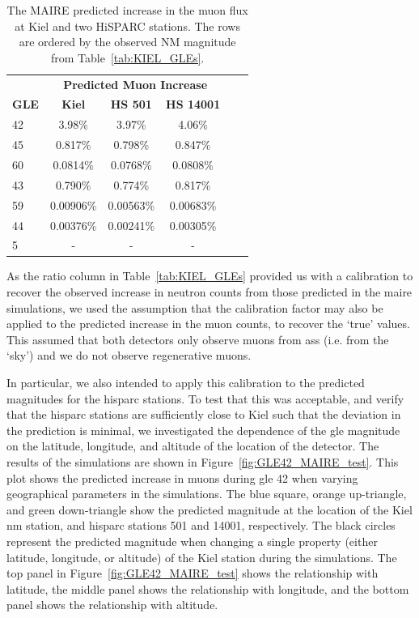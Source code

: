 \begin{table}[ht!]
	\begin{center}
		\caption{The MAIRE predicted increase in the muon flux at Kiel and two HiSPARC stations. The rows are ordered by the observed NM magnitude from Table~\ref{tab:KIEL_GLEs}.}
		\label{tab:MAIRE_raw_muons}
		\begin{tabular}{l c c c c c}
			\hline
			&  \multicolumn{3}{c}{\bf Predicted Muon Increase} \\
			{\bf GLE} & {\bf Kiel} & {\bf HS 501} & {\bf HS 14001} \\
			\hline
			42 & 3.98\%    & 3.97\%    & 4.06\%  \\
			45 & 0.817\%    & 0.798\%    & 0.847\%  \\
			60 & 0.0814\%   & 0.0768\%   & 0.0808\%  \\
			43 & 0.790\%    & 0.774\%    & 0.817\%  \\
			59 & 0.00906\%  & 0.00563\%  & 0.00683\%  \\
			44 & 0.00376\% & 0.00241\% & 0.00305\%  \\
			5 & - & - & - \\
			\hline
		\end{tabular}
	\end{center}
\end{table}


As the ratio column in Table~\ref{tab:KIEL_GLEs} provided us with a calibration to recover the observed increase in neutron counts from those predicted in the \gls{maire} simulations, we used the assumption that the calibration factor may also be applied to the predicted increase in the muon counts, to recover the `true' values. This assumed that both detectors only observe muons from \glspl{as} (i.e. from the `sky') and we do not observe regenerative muons.

In particular, we also intended to apply this calibration to the predicted magnitudes for the \gls{hisparc} stations. To test that this was acceptable, and verify that the \gls{hisparc} stations are sufficiently close to Kiel such that the deviation in the prediction is minimal, we investigated the dependence of the \gls{gle} magnitude on the latitude, longitude, and altitude of the location of the detector. The results of the simulations are shown in Figure~\ref{fig:GLE42_MAIRE_test}. This plot shows the predicted increase in muons during \gls{gle} 42 when varying geographical parameters in the simulations. The blue square, orange up-triangle, and green down-triangle show the predicted magnitude at the location of the Kiel \gls{nm} station, and \gls{hisparc} stations 501 and 14001, respectively. The black circles represent the predicted magnitude when changing a single property (either latitude, longitude, or altitude) of the Kiel station during the simulations. The top panel in Figure~\ref{fig:GLE42_MAIRE_test} shows the relationship with latitude, the middle panel shows the relationship with longitude, and the bottom panel shows the relationship with altitude. %


